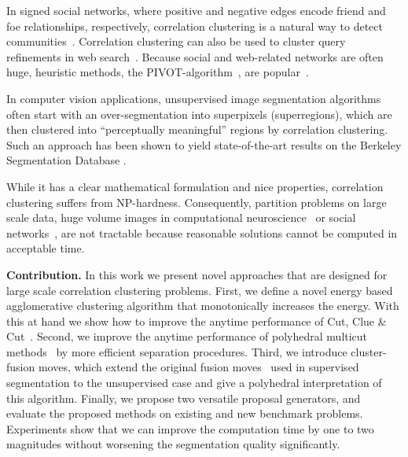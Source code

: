 \documentclass[extendedabs]{bmvc2k}
\begin{document}
In signed social networks, where positive and negative edges encode friend and foe relationships, respectively,
correlation clustering is a natural way to detect communities~\cite{Chen-2012,Chierichetti-2014}.
Correlation clustering can also be used to cluster query refinements in web search~\cite{Sadikov-2010}.
Because social and web-related networks are often huge, heuristic methods, \eg the PIVOT-algorithm~\cite{Ailon-2008},
are popular~\cite{Chierichetti-2014}.

In computer vision applications, unsupervised image segmentation algorithms often start with an over-segmentation
into superpixels (superregions), which are then clustered into ``perceptually meaningful''
regions by correlation clustering.
Such an approach has been shown to yield
state-of-the-art results on the Berkeley Segmentation Database
\cite{andres_2011_iccv,Kim-2011,yarkony_2012_eccv,alush_2013_simbad}.

While it has a clear mathematical formulation and nice properties,
correlation clustering suffers from NP-hardness. 
%
Consequently, partition problems on large scale data, \eg
huge volume images in computational neuroscience~\cite{kroeger_2012_eccv}
or social networks~\cite{Leskovec-2010}, 
are not tractable because reasonable solutions cannot be computed in acceptable time.


\vspace{0.1cm}
\noindent \textbf{Contribution.}
In this work we present novel approaches that are designed for large scale correlation clustering problems.
First, we define a novel energy based agglomerative clustering algorithm that monotonically increases the energy.
With this at hand we show how to improve the anytime performance of Cut, Clue \& Cut~\cite{beier_2014_cvpr}.
%
Second, we improve the anytime performance of polyhedral multicut methods~\cite{kappes_2013_arxiv} by more efficient separation procedures.
%
Third, we introduce cluster-fusion moves, which extend the original fusion moves~\cite{Lempitsky-2010} 
used in supervised segmentation to the unsupervised case and give a polyhedral interpretation of this algorithm.
Finally, we propose two versatile proposal generators, and evaluate the proposed methods on existing and new benchmark problems.
Experiments show that we can improve the computation time by one to two magnitudes without worsening the segmentation 
quality significantly.




\end{document}
